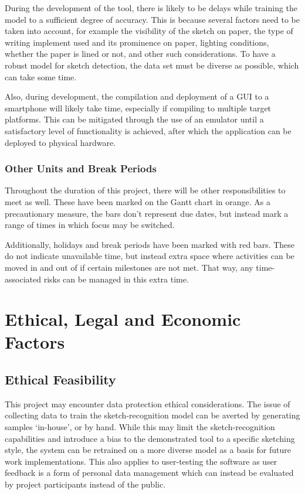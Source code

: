 \documentclass{article}
\begin{document}
During the development of the tool, there is likely to be delays while training the model to a sufficient 
degree of accuracy. This is because several factors need to be taken into account, for example the visibility
of the sketch on paper, the type of writing implement used and its prominence on paper, lighting conditions, 
whether the paper is lined or not, and other such considerations. To have a robust model for sketch detection,
the data set must be diverse as possible, which can take some time.

Also, during development, the compilation and deployment of a \gls{GUI} to a smartphone will likely take time,
especially if compiling to multiple target platforms. This can be mitigated through the use of an emulator
until a satisfactory level of functionality is achieved, after which the application can be deployed to physical 
hardware.

\subsubsection{Other Units and Break Periods}
\label{subsubsec:Other Units and Break Periods}

Throughout the duration of this project, there will be other responsibilities to meet as well. These have
been marked on the Gantt chart in orange. As a precautionary measure, the bars don't represent due dates, 
but instead mark a range of times in which focus may be switched.

Additionally, holidays and break periods have been marked with red bars. These do not indicate unavailable
time, but instead extra space where activities can be moved in and out of if certain milestones are not met.
That way, any time-associated risks can be managed in this extra time.



\pagebreak
\section{Ethical, Legal and Economic Factors}
\label{sec:Ethical, Legal and Economic Factors}

\subsection{Ethical Feasibility}
\label{subsec:Ethical Feasibility}

This project may encounter data protection ethical considerations. The issue of collecting data to train the sketch-recognition 
model can be averted by generating samples `in-house', or by hand. While this may limit the sketch-recognition
capabilities and introduce a bias to the demonstrated tool to a specific sketching style, the system can be 
retrained on a more diverse model as a basis for future work implementations. This also applies to user-testing
the software as user feedback is a form of personal data management which can instead be evaluated by project participants 
instead of the public.
\end{document}

